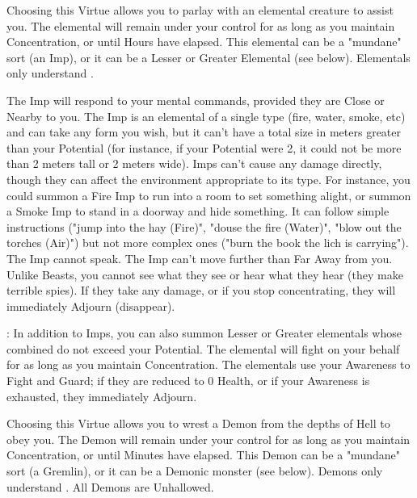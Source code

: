 \cbreak


Choosing this Virtue allows you to parlay with an elemental creature to assist you.  The elemental will remain under your control for as long as you maintain Concentration, or until Hours have elapsed.  This elemental can be a "mundane" sort (an Imp), or it can be a Lesser or Greater Elemental (see below).  Elementals only understand .

  The Imp will respond to your mental commands, provided they are Close or Nearby to you.  The Imp is an elemental of a single type (fire, water, smoke, etc) and can take any form you wish, but it can't have a total size in meters greater than your Potential (for instance, if your Potential were 2, it could not be more than 2 meters tall or 2 meters wide). Imps can't cause any damage directly, though they can affect the environment appropriate to its type.  For instance, you could summon a Fire Imp to run into a room to set something alight, or summon a Smoke Imp to stand in a doorway and hide something.   It can follow simple instructions ("jump into the hay (Fire)", "douse the fire (Water)", "blow out the torches (Air)") but not more complex ones ("burn the book the lich is carrying").  The Imp cannot speak. The Imp can't move further than Far Away from you.  Unlike Beasts, you cannot see what they see or hear what they hear (they make terrible spies). If they take any damage, or if you stop concentrating, they will immediately Adjourn (disappear).

:  In addition to Imps, you can also summon Lesser or Greater elementals whose combined \HD do not exceed your Potential.  The elemental will fight on your behalf for as long as you maintain Concentration.  The elementals use your Awareness \UD to Fight and Guard; if they are reduced to 0 Health, or if your Awareness is exhausted, they immediately Adjourn.



\newpage


Choosing this Virtue allows you to wrest a Demon from the depths of Hell to obey you.  The Demon will remain under your control for as long as you maintain Concentration, or until Minutes have elapsed.  This Demon can be a "mundane" sort (a Gremlin), or it can be a Demonic monster (see below).  Demons only understand .
All Demons are Unhallowed. 


